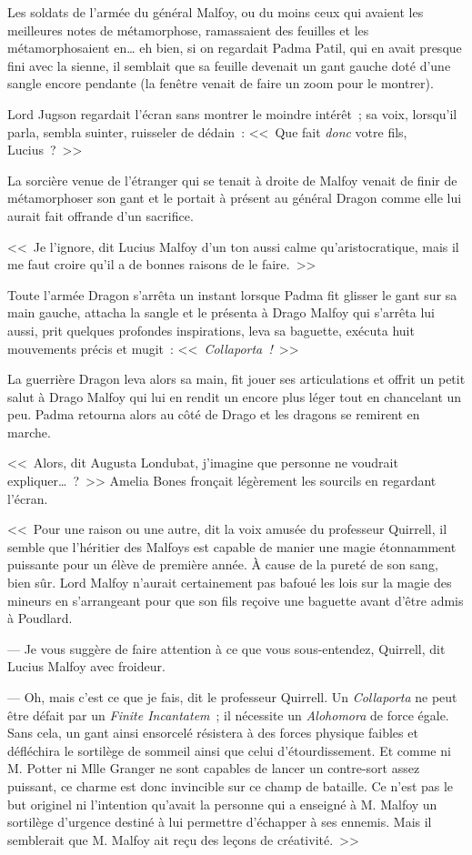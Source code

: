Les soldats de l'armée du général Malfoy, ou du moins ceux qui avaient les meilleures notes de métamorphose, ramassaient des feuilles et les métamorphosaient en… eh bien, si on regardait Padma Patil, qui en avait presque fini avec la sienne, il semblait que sa feuille devenait un gant gauche doté d'une sangle encore pendante (la fenêtre venait de faire un zoom pour le montrer).

Lord Jugson regardait l'écran sans montrer le moindre intérêt~; sa voix, lorsqu'il parla, sembla suinter, ruisseler de dédain~: <<~Que fait \emph{donc} votre fils, Lucius~?~>>

La sorcière venue de l'étranger qui se tenait à droite de Malfoy venait de finir de métamorphoser son gant et le portait à présent au général Dragon comme elle lui aurait fait offrande d'un sacrifice.

<<~Je l'ignore, dit Lucius Malfoy d'un ton aussi calme qu'aristocratique, mais il me faut croire qu'il a de bonnes raisons de le faire.~>>

Toute l'armée Dragon s'arrêta un instant lorsque Padma fit glisser le gant sur sa main gauche, attacha la sangle et le présenta à Drago Malfoy qui s'arrêta lui aussi, prit quelques profondes inspirations, leva sa baguette, exécuta huit mouvements précis et mugit~: <<~\emph{Collaporta~!}~>>

La guerrière Dragon leva alors sa main, fit jouer ses articulations et offrit un petit salut à Drago Malfoy qui lui en rendit un encore plus léger tout en chancelant un peu. Padma retourna alors au côté de Drago et les dragons se remirent en marche.

<<~Alors, dit Augusta Londubat, j'imagine que personne ne voudrait expliquer…~?~>> Amelia Bones fronçait légèrement les sourcils en regardant l'écran.

<<~Pour une raison ou une autre, dit la voix amusée du professeur Quirrell, il semble que l'héritier des Malfoys est capable de manier une magie étonnamment puissante pour un élève de première année. À cause de la pureté de son sang, bien sûr. Lord Malfoy n'aurait certainement pas bafoué les lois sur la magie des mineurs en s'arrangeant pour que son fils reçoive une baguette avant d'être admis à Poudlard.

--- Je vous suggère de faire attention à ce que vous sous-entendez, Quirrell, dit Lucius Malfoy avec froideur.

--- Oh, mais c'est ce que je fais, dit le professeur Quirrell. Un \emph{Collaporta} ne peut être défait par un \emph{Finite Incantatem}~; il nécessite un \emph{Alohomora} de force égale. Sans cela, un gant ainsi ensorcelé résistera à des forces physique faibles et défléchira le sortilège de sommeil ainsi que celui d'étourdissement. Et comme ni M. Potter ni Mlle Granger ne sont capables de lancer un contre-sort assez puissant, ce charme est donc invincible sur ce champ de bataille. Ce n'est pas le but originel ni l'intention qu'avait la personne qui a enseigné à M. Malfoy un sortilège d'urgence destiné à lui permettre d'échapper à ses ennemis. Mais il semblerait que M. Malfoy ait reçu des leçons de créativité.~>>

